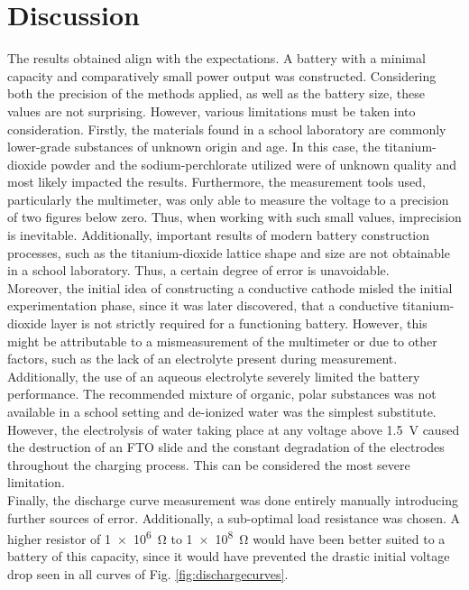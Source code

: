 \section{Discussion}
The results obtained align with the expectations. A battery with a minimal capacity and comparatively small power output was constructed. Considering both the precision of the methods applied, as well as the battery size, these values are not surprising. 
However, various limitations must be taken into consideration. Firstly, the materials found in a school laboratory are commonly lower-grade substances of unknown origin and age. In this case, the titanium-dioxide powder and the sodium-perchlorate utilized were of unknown quality and most likely impacted the results. Furthermore, the measurement tools used, particularly the multimeter, was only able to measure the voltage to a precision of two figures below zero. Thus, when working with such small values, imprecision is inevitable. Additionally, important results of modern battery construction processes, such as the titanium-dioxide lattice shape and size are not obtainable in a school laboratory. Thus, a certain degree of error is unavoidable.\\
Moreover, the initial idea of constructing a conductive cathode misled the initial experimentation phase, since it was later discovered, that a conductive titanium-dioxide layer is not strictly required for a functioning battery. However, this might be attributable to a mismeasurement of the multimeter or due to other factors, such as the lack of an electrolyte present during measurement. Additionally, the use of an aqueous electrolyte severely limited the battery performance. The recommended mixture of organic, polar substances was not available in a school setting and de-ionized water was the simplest substitute. However, the electrolysis of water taking place at any voltage above \SI{1.5}{\V} caused the destruction of an FTO slide and the constant degradation of the electrodes throughout the charging process. This can be considered the most severe limitation.\\
Finally, the discharge curve measurement was done entirely manually introducing further sources of error. Additionally, a sub-optimal load resistance was chosen. A higher resistor of \SI{1e6}{\ohm} to \SI{1e8}{\ohm} would have been better suited to a battery of this capacity, since it would have prevented the drastic initial voltage drop seen in all curves of Fig. \ref{fig:dischargecurves}.

   